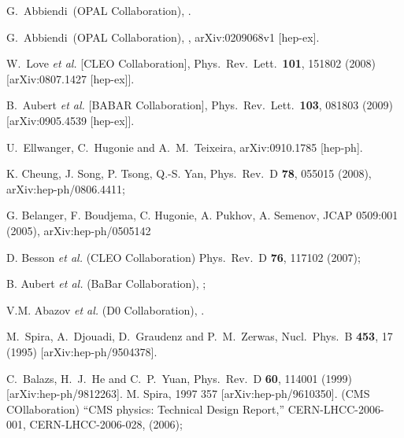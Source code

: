 \documentclass[aps,prl,twocolumn,nofootinbib,superscriptaddress]{revtex4}
\begin{document}
\begin{thebibliography}{99}
 G.~Abbiendi~\etal (OPAL Collaboration),
.

 G.~Abbiendi~\etal (OPAL Collaboration),
, arXiv:0209068v1 [hep-ex].

  W.~Love {\it et al.}  [CLEO Collaboration],
  Phys.\ Rev.\ Lett.\  {\bf 101}, 151802 (2008)
  [arXiv:0807.1427 [hep-ex]].

  B.~Aubert {\it et al.}  [BABAR Collaboration],
  Phys.\ Rev.\ Lett.\  {\bf 103}, 081803 (2009)
  [arXiv:0905.4539 [hep-ex]].

  U.~Ellwanger, C.~Hugonie and A.~M.~Teixeira,
  arXiv:0910.1785 [hep-ph].

 K. Cheung, J. Song, P. Tsong, Q.-S. Yan, Phys.\ Rev.\ D {\bf 78}, 055015 (2008), arXiv:hep-ph/0806.4411; 

 G. Belanger, F. Boudjema, C. Hugonie, A. Pukhov, A. Semenov, JCAP 0509:001 (2005), arXiv:hep-ph/0505142

 D. Besson {\it et al.} (CLEO Collaboration) Phys.\ Rev.\ D {\bf 76}, 117102 (2007); 

 B. Aubert {\it et al.} (BaBar Collaboration), ;

 V.M. Abazov {\it et al.} (D0 Collaboration), .


  M.~Spira, A.~Djouadi, D.~Graudenz and P.~M.~Zerwas,
  Nucl.\ Phys.\  B {\bf 453}, 17 (1995)
  [arXiv:hep-ph/9504378].

  C.~Balazs, H.~J.~He and C.~P.~Yuan,
  Phys.\ Rev.\  D {\bf 60}, 114001 (1999)
  [arXiv:hep-ph/9812263].
 M. Spira,  {1997} {357} [arXiv:hep-ph/9610350].
  (CMS COllaboration) ``CMS physics: Technical Design Report,''  CERN-LHCC-2006-001, 
CERN-LHCC-2006-028, (2006);


\end{thebibliography}
\end{document}

